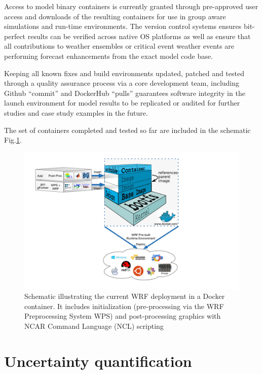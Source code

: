 \documentclass[draft]{ametsoc}
\begin{document}
Access to model binary containers is currently granted through pre-approved user access and downloads of the resulting containers for use in group aware simulations and run-time environments.  The version control systems ensures bit-perfect results can be verified across native OS platforms as well as ensure that all contributions to weather ensembles or critical event weather events are performing forecast enhancements from the exact model code base.

Keeping all known fixes and build environments updated, patched and tested through a quality assurance process via a core development team, including Github ``commit'' and DockerHub ``pulls'' guarantees software integrity in the launch environment for model results to be replicated or audited for further studies and case study examples in the future.

The set of containers completed and tested so far are included in the schematic Fig.\@ \ref{Fig:Docker}.

\begin{figure}

\begin{center}
\includegraphics[scale=0.2]{figures/WRF-Docker-Deploy.jpg}
\caption{\label{Fig:Docker} Schematic illustrating the current WRF deployment in a Docker container. It includes initialization (pre-processing via the WRF Preprocessing System WPS) and post-processing graphics with NCAR Command Language (NCL) scripting}
\end{center}
\end{figure}



\section{Uncertainty quantification}
\end{document}
